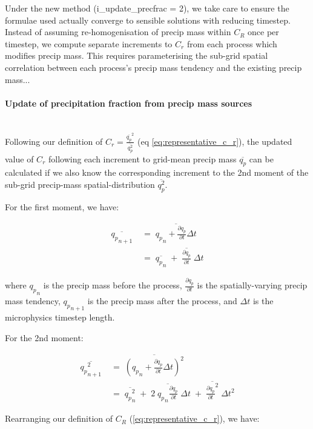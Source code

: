 \documentclass{UMDP_article}
\begin{document}
Under the new method (i\_update\_precfrac = 2), we take care to ensure the
formulae used actually converge to sensible solutions with reducing timestep.
Instead of assuming re-homogenisation of precip mass within $C_R$
once per timestep, we compute separate increments to $C_r$ from each process
which modifies precip mass.  This requires parameterising the
sub-grid spatial correlation between each process's precip mass tendency
and the existing precip mass...

\paragraph{Update of precipitation fraction from precip mass sources}
~\\

Following our definition of
$C_r = \frac{ \overline{q_p}^2 }{ \overline{q_p^2} }$
(eq \ref{eq:representative_c_r}),
the updated value of $C_r$ following each increment to grid-mean precip mass
$\overline{q_p}$
can be calculated if we also know the corresponding increment to the
2nd moment of the sub-grid precip-mass spatial-distribution
$\overline{q_p^2}$.

For the first moment, we have:

\begin{align}
\overline{{q_p}_{n+1}}
 & \;= \; \overline{ {q_p}_n + \frac{\partial q_p}{\partial t} \Delta t }
\nonumber \\
 & \; = \; \overline{ {q_p}_n }
   \; + \; \overline{ \frac{\partial q_p}{\partial t} } \; \Delta t
\label{eq:q_p_np1}
\end{align}

where ${q_p}_n$ is the precip mass before the process,
$\frac{\partial q_p}{\partial t}$ is the spatially-varying precip mass tendency,
${q_p}_{n+1}$ is the precip mass after the process, and
$\Delta t$ is the microphysics timestep length.

For the 2nd moment:

\begin{align}
\overline{{q_p}_{n+1}^2}
 & \; = \; \overline{ \left( {q_p}_n + \frac{\partial q_p}{\partial t} \Delta t
               \right)^2 }
\nonumber \\
 & \; = \; \overline{ {q_p}_n^2 }
   \; + \; 2 \; \overline{ {q_p}_n \frac{\partial q_p}{\partial t} } \; \Delta t
   \; + \; \overline{ \frac{\partial q_p}{\partial t}^2 } \; \Delta t^2
\label{eq:q_p_np1_sq_1}
\end{align}

Rearranging our definition of $C_R$ (\ref{eq:representative_c_r}), we have:
\end{document}
